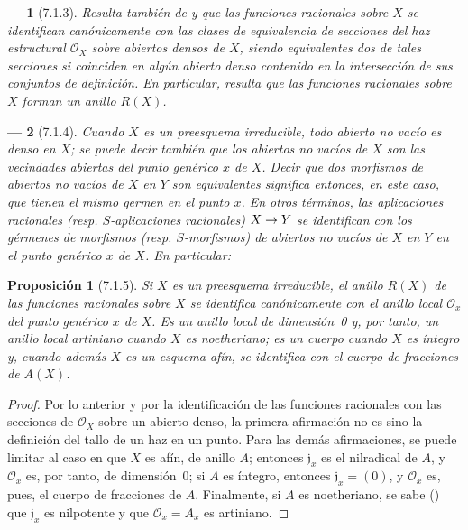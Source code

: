 \documentclass[oneside]{amsart}
\theoremstyle{ega-env-style}
\newtheorem*{env}{---}
\theoremstyle{ega-thm-env-style}
\newtheorem*{proposition}{Proposición}
\theoremstyle{ega-defn-env-style}
\renewcommand{\to}{\mathchoice{\longrightarrow}{\rightarrow}{\rightarrow}{\rightarrow}}
\let\EGAOriginalLabel\label
\renewcommand{\label}[1]{\phantomsection\EGAOriginalLabel{#1}}
\begin{document}
\begin{env}[7.1.3]
\label{I.7.1.3}
Resulta también de  y  que las funciones racionales sobre $X$ se identifican canónicamente con las \emph{clases de equivalencia de secciones del haz estructural $\mathscr{O}_X$} sobre abiertos densos de $X$, siendo equivalentes dos de tales secciones si coinciden en algún abierto denso contenido en la intersección de sus conjuntos de definición.
En particular, resulta que las funciones racionales sobre $X$ forman un \emph{anillo} $R(X)$.
\end{env}

\begin{env}[7.1.4]
\label{I.7.1.4}
Cuando $X$ es un preesquema \emph{irreducible}, todo abierto no vacío es denso en $X$; se puede decir también que los abiertos no vacíos de $X$ son las \emph{vecindades abiertas del punto genérico} $x$ de $X$.
Decir que dos morfismos de abiertos no vacíos de $X$ en $Y$ son equivalentes significa entonces, en este caso, que tienen el \emph{mismo germen} en el punto $x$.
En otros términos, las aplicaciones racionales (resp. $S$-aplicaciones racionales) $X\to Y$ se identifican con los \emph{gérmenes de morfismos} (resp. \emph{$S$-morfismos}) de abiertos no vacíos de $X$ en $Y$ en el punto genérico $x$ de $X$.
En particular:
\end{env}

\begin{proposition}[7.1.5]
\label{I.7.1.5}
Si $X$ es un preesquema irreducible, el anillo $R(X)$ de las funciones racionales sobre $X$ se identifica canónicamente con el anillo local $\mathscr{O}_x$ del punto genérico $x$ de $X$.
Es un anillo local de dimensión~\textup{0} y, por tanto, un anillo local artiniano cuando $X$ es noetheriano; es un cuerpo cuando $X$ es íntegro y, cuando además $X$ es un esquema afín, se identifica con el cuerpo de fracciones de $A(X)$.
\end{proposition}

\begin{proof}
Por lo anterior y por la identificación de las funciones racionales con las secciones de $\mathscr{O}_X$ sobre un abierto denso, la primera afirmación no es sino la definición del tallo de un haz en un punto.
Para las demás afirmaciones, se puede limitar al caso en que $X$ es afín, de anillo $A$; entonces $\mathfrak{j}_x$ es el nilradical de $A$, y $\mathscr{O}_x$ es, por tanto, de dimensión~0; si $A$ es íntegro, entonces $\mathfrak{j}_x=(0)$, y $\mathscr{O}_x$ es, pues, el cuerpo de fracciones de $A$.
Finalmente, si $A$ es noetheriano, se sabe (\cite[p.~127, cor.~4]{I-11}) que $\mathfrak{j}_x$ es nilpotente y que $\mathscr{O}_x=A_x$ es artiniano.
\end{proof}
\end{document}

